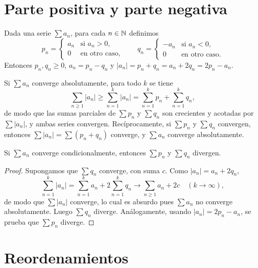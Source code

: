 \section{Parte positiva y parte negativa}

\begin{definition}
  Dada una serie \(\sum a_n\), para cada \(n \in \mathbb{N}\) definimos
  \[
    p_n =
    \begin{cases}
      a_n & \text{si } a_n > 0,    \\
      0   & \text{en otro caso},
    \end{cases}
    \qquad
    q_n =
    \begin{cases}
      -a_n & \text{si } a_n < 0,    \\
      0    & \text{en otro caso}.
    \end{cases}
  \]
  Entonces \(p_n, q_n \geq 0\), \(a_n = p_n - q_n\) y \(|a_n| = p_n + q_n = a_n + 2 q_n = 2 p_n - a_n\).
\end{definition}

\begin{note}
  Si \(\sum a_n\) converge absolutamente, para todo \(k\) se tiene
  \[
    \sum_{n \geq 1} |a_n| \geq \sum_{n=1}^{k} |a_n| = \sum_{n=1}^{k} p_n + \sum_{n=1}^{k} q_n,
  \]
  de modo que las sumas parciales de \(\sum p_n\) y \(\sum q_n\) son crecientes y acotadas por \(\sum |a_n|\), y ambas series convergen. Recíprocamente, si \(\sum p_n\) y \(\sum q_n\) convergen, entonces \(\sum |a_n| = \sum (p_n + q_n)\) converge, y \(\sum a_n\) converge absolutamente.
\end{note}

\begin{theorem}
  Si \(\sum a_n\) converge condicionalmente, entonces \(\sum p_n\) y \(\sum q_n\) divergen.
\end{theorem}

\begin{proof}
  Supongamos que \(\sum q_n\) converge, con suma \(c\). Como \(|a_n| = a_n + 2 q_n\),
  \[
    \sum_{n=1}^{k} |a_n| = \sum_{n=1}^{k} a_n + 2 \sum_{n=1}^{k} q_n \longrightarrow \sum_{n \geq 1} a_n + 2c \quad (k \to \infty),
  \]
  de modo que \(\sum |a_n|\) converge, lo cual es absurdo pues \(\sum a_n\) no converge absolutamente. Luego \(\sum q_n\) diverge. Análogamente, usando \(|a_n| = 2 p_n - a_n\), se prueba que \(\sum p_n\) diverge.
\end{proof}

\section{Reordenamientos}

